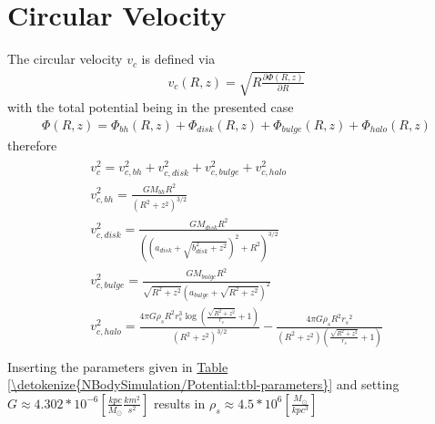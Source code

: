 \documentclass[letterpaper,10pt,english]{sphinxmanual}
\begin{document}
\section{Circular Velocity}
\label{\detokenize{NBodySimulation/Potential:circular-velocity}}
\sphinxAtStartPar
The circular velocity \(v_{c}\) is defined via
\begin{equation}\label{equation:NBodySimulation/Potential:circular_velocity}
\begin{split}v_{c}\left ( R,z \right ) = \sqrt{R\frac{\partial \Phi \left (R,z  \right )}{\partial R}   }\end{split}
\end{equation}
\sphinxAtStartPar
with the total potential being in the presented case
\begin{equation}\label{equation:NBodySimulation/Potential:total_potential}
\begin{split}\Phi \left ( R,z \right ) = \Phi_{bh} \left ( R,z \right )+\Phi_{disk} \left ( R,z \right )+\Phi_{bulge} \left ( R,z \right )+\Phi_{halo} \left ( R,z \right )\end{split}
\end{equation}
\sphinxAtStartPar
therefore
\begin{align*}\!\begin{aligned}
v_{c}^{2} = v_{c,bh}^{2}+v_{c,disk}^{2}+v_{c,bulge}^{2}+v_{c,halo}^{2}\\
v_{c,bh}^{2} = \frac{G M_{bh} R^2}{\left(R^2+z^2\right)^{3/2}}\\
v_{c,disk}^{2} = \frac{GM_{disk}R^2}{\left(\left(a_{disk}+\sqrt{b_{disk}^2+z^2}\right)^2+R^2\right)^{3/2}}\\
v_{c,bulge}^{2} = \frac{G M_{bulge} R^2}{\sqrt{R^2+z^2} \left(a_{bulge}+\sqrt{R^2+z^2}\right)^2}\\
v_{c,halo}^{2} = \frac{4 \pi G \rho _{s} R^2 r_{s}^3 \log \left(\frac{\sqrt{R^2+z^2}}{r_{s}}+1\right)}{\left(R^2+z^2\right)^{3/2}}-\frac{4\pi G\rho_{s} R^2 {r_{s}}^2}{\left(R^2+z^2\right) \left(\frac{\sqrt{R^2+z^2}}{r_{s}}+1\right)}\\
\end{aligned}\end{align*}
\sphinxAtStartPar
Inserting the parameters given in \hyperref[\detokenize{NBodySimulation/Potential:tbl-parameters}]{Table \ref{\detokenize{NBodySimulation/Potential:tbl-parameters}}} and setting \(G\approx 4.302*10^{-6}\left [ \frac{kpc}{M_\odot}\frac{km^{2}}{s^{2}} \right ]\) results in \(\rho_{s}\approx 4.5*10^{6} \left [ \frac{M_\odot}{kpc^{3}} \right ]\)
\end{document}
